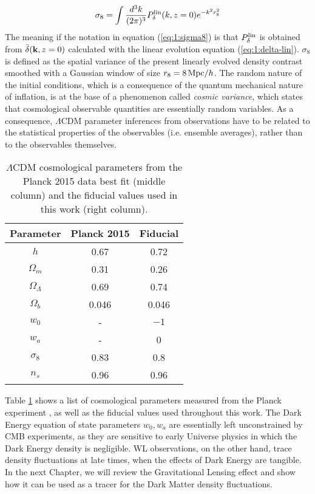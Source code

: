 \begin{equation}
\label{eq:1:sigma8}
\sigma_8 = \int \frac{d^3k}{(2\pi)^3} P^{\rm lin}_\delta(k,z=0)e^{-k^2 r_8^2}
\end{equation} 
%
The meaning if the notation in equation (\ref{eq:1:sigma8}) is that $P_\delta^{\rm lin}$ is obtained from $\tilde{\delta}(\mathbf{k},z=0)$ calculated with the linear evolution equation (\ref{eq:1:delta-lin}). $\sigma_8$ is defined as the spatial variance of the present linearly evolved density contrast smoothed with a Gaussian window of size $r_8=8\,{\rm Mpc}/h$. The random nature of the initial conditions, which is a consequence of the quantum mechanical nature of inflation, is at the base of a phenomenon called \textit{cosmic variance}, which states that cosmological observable quantities are essentially random variables. As a consequence, $\Lambda$CDM parameter inferences from observations have to be related to the statistical properties of the observables (i.e. ensemble averages), rather than to the observables themselves. 
%
\begin{table}
\begin{center}
\begin{tabular}[h]{c|c|c}

\textbf{Parameter} & \textbf{Planck 2015} & \textbf{Fiducial} \\ \hline 

$h$ & 0.67 & 0.72 \\
$\Omega_m$ & 0.31 & 0.26 \\
$\Omega_\Lambda$ & 0.69 & 0.74 \\
$\Omega_b$ & 0.046 & 0.046 \\
$w_0$ & - & $-1$ \\
$w_a$ & - & 0 \\
$\sigma_8$ & 0.83 & 0.8 \\
$n_s$ & 0.96 & 0.96 \\

\end{tabular}
\end{center}
\caption{$\Lambda$CDM cosmological parameters from the Planck 2015 \citep{Planck15} data best fit (middle column) and the fiducial values used in this work (right column).}
\label{tab:1:cosmopar}
\end{table}
%
Table \ref{tab:1:cosmopar} shows a list of cosmological parameters measured from the Planck experiment \citep{Planck15}, as well as the fiducial values used throughout this work. The Dark Energy equation of state parameters $w_0,w_a$ are essentially left unconstrained by CMB experiments, as they are sensitive to early Universe physics in which the Dark Energy density is negligible. WL observations, on the other hand, trace density fluctuations at late times, when the effects of Dark Energy are tangible. In the next Chapter, we will review the Gravitational Lensing effect and show how it can be used as a tracer for the Dark Matter density fluctuations. 

%